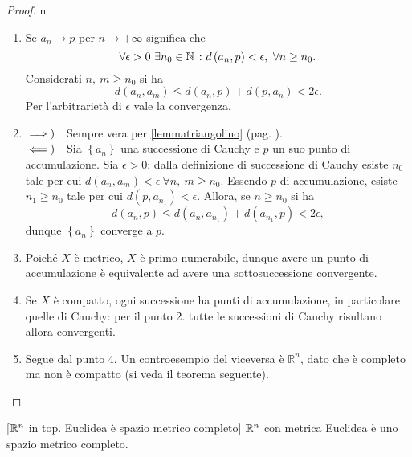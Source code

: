 \begin{proof}{n}~{}
	\begin{enumerate}[label=\Roman*]
		\item Se $a_n\to p$ per $n\to +\infty$ significa che
		\begin{equation*}
			\forall \epsilon>0\ \exists n_0\in\N\ \colon d\left(a_n,p\right)<\epsilon,\ \forall n\geq n_0.
		\end{equation*}
	Considerati $n,\ m\geq n_0$ si ha
	\begin{equation*}
		d\left(a_n,a_m\right)\leq d\left(a_n,p\right)+d\left(p,a_n\right)< 2\epsilon.
	\end{equation*}
Per l'arbitrarietà di $\epsilon$ vale la convergenza.
\item $\implies)\quad$Sempre vera per \ref{lemmatriangolino} (pag. \pageref{lemmatriangolino}).\\
$\impliedby)\quad$Sia $\left\{a_n\right\}$ una successione di Cauchy e $p$ un suo punto di accumulazione. Sia $\epsilon>0$: dalla definizione di successione di Cauchy esiste $n_0$ tale per cui $d\left(a_n,a_m\right)<\epsilon\ \forall n,\ m\geq n_0$. Essendo $p$ di accumulazione, esiste $ n_1\geq n_0$ tale per cui $d\left(p,a_{n_1}\right)<\epsilon$. Allora, se $n\geq n_0$ si ha
	\begin{equation*}
	d\left(a_n,p\right)\leq d\left(a_n,a_{n_1}\right)+d\left(a_{n_1},p\right)< 2\epsilon,
\end{equation*}
dunque $\left\{a_n\right\}$ converge a $p$.
\item Poiché $X$ è metrico, $X$ è primo numerabile, dunque avere un punto di accumulazione è equivalente ad avere una sottosuccessione convergente.
\item Se $X$ è compatto, ogni successione ha punti di accumulazione, in particolare quelle di Cauchy: per il punto 2. tutte le successioni di Cauchy risultano allora convergenti.
\item Segue dal punto 4. Un controesempio del viceversa è $\mathbb{R}^n$, dato che è completo ma non è compatto (si veda il teorema seguente).\qedhere
\end{enumerate}
\end{proof}
\begin{theorem}{}[$\mathbb{R}^n$ in top. Euclidea è spazio metrico completo]
	$\mathbb{R}^n$ con metrica Euclidea è uno spazio metrico completo.
\end{theorem}
